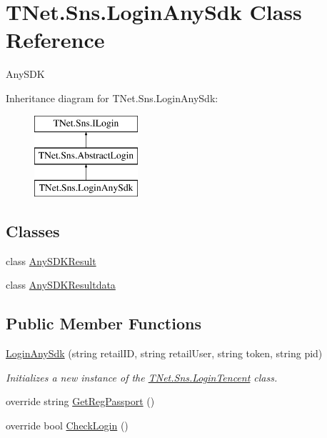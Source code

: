 \hypertarget{class_t_net_1_1_sns_1_1_login_any_sdk}{}\section{T\+Net.\+Sns.\+Login\+Any\+Sdk Class Reference}
\label{class_t_net_1_1_sns_1_1_login_any_sdk}


Any\+S\+DK  


Inheritance diagram for T\+Net.\+Sns.\+Login\+Any\+Sdk\+:\begin{figure}[H]
\begin{center}
\leavevmode
\includegraphics[height=3.000000cm]{class_t_net_1_1_sns_1_1_login_any_sdk}
\end{center}
\end{figure}
\subsection*{Classes}
\begin{DoxyCompactItemize}
\item 
class \mbox{\hyperlink{class_t_net_1_1_sns_1_1_login_any_sdk_1_1_any_s_d_k_result}{Any\+S\+D\+K\+Result}}
\item 
class \mbox{\hyperlink{class_t_net_1_1_sns_1_1_login_any_sdk_1_1_any_s_d_k_resultdata}{Any\+S\+D\+K\+Resultdata}}
\end{DoxyCompactItemize}
\subsection*{Public Member Functions}
\begin{DoxyCompactItemize}
\item 
\mbox{\hyperlink{class_t_net_1_1_sns_1_1_login_any_sdk_a717769a77709916f902b286e501ef0c3}{Login\+Any\+Sdk}} (string retail\+ID, string retail\+User, string token, string pid)
\begin{DoxyCompactList}\small\item\em Initializes a new instance of the \mbox{\hyperlink{class_t_net_1_1_sns_1_1_login_tencent}{T\+Net.\+Sns.\+Login\+Tencent}} class. \end{DoxyCompactList}\item 
override string \mbox{\hyperlink{class_t_net_1_1_sns_1_1_login_any_sdk_a70ac7a7b2956ddc6c3d9c7bbba4d99c5}{Get\+Reg\+Passport}} ()
\item 
override bool \mbox{\hyperlink{class_t_net_1_1_sns_1_1_login_any_sdk_a88210952068fcd88986d273ea6b04e86}{Check\+Login}} ()
\end{DoxyCompactItemize}
